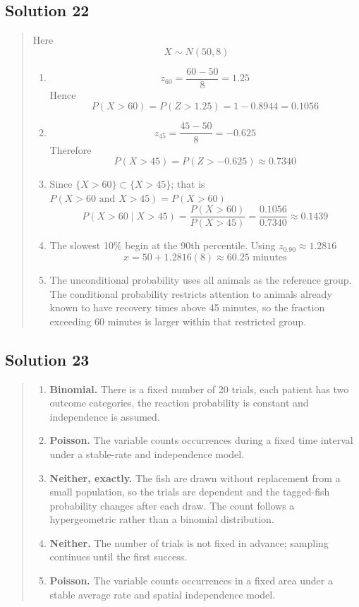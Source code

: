 \documentclass[10pt,letterpaper]{article}
\newcommand{\solutionheading}[1]{%
  \subsection*{Solution #1}
}
\newenvironment{answer}{%
  \begin{quote}\small\color{black}
}{%
  \end{quote}
}
\begin{document}
\solutionheading{22}
\begin{answer}
Here
$$X\sim N(50,8)$$
\begin{enumerate}
	\item
	$$z_{60}=\frac{60-50}{8}=1.25$$	
  	Hence
 	$$P(X>60)=P(Z>1.25)=1-0.8944=0.1056$$
  	\item
	$$z_{45}=\frac{45-50}{8}=-0.625$$
  	Therefore
 	$$P(X>45)=P(Z>-0.625)\approx0.7340$$
  	\item Since $\{X>60\}\subset\{X>45\}$; that is $P(X > 60 \text{ and } X>45) = P(X>60)$
 	$$P(X>60\mid X>45)=\frac{P(X>60)}{P(X>45)}=\frac{0.1056}{0.7340}\approx0.1439$$
  	\item The slowest 10\% begin at the 90th percentile. Using $z_{0.90}\approx1.2816$
	$$x=50+1.2816(8)\approx60.25\text{ minutes}$$
	\item The unconditional probability uses all animals as the reference group. The conditional probability restricts attention to animals already known to have recovery times above 45 minutes, so the fraction exceeding 60 minutes is larger within that restricted group.
\end{enumerate}
\end{answer}

\solutionheading{23}
\begin{answer}
\begin{enumerate}
	\item \textbf{Binomial.} There is a fixed number of 20 trials, each patient has two outcome categories, the reaction probability is constant and independence is assumed.
	\item \textbf{Poisson.} The variable counts occurrences during a fixed time interval under a stable-rate and independence model.
	\item \textbf{Neither, exactly.} The fish are drawn without replacement from a small population, so the trials are dependent and the tagged-fish probability changes after each draw. The count follows a hypergeometric rather than a binomial distribution.
	\item \textbf{Neither.} The number of trials is not fixed in advance; sampling continues until the first success.
	\item \textbf{Poisson.} The variable counts occurrences in a fixed area under a stable average rate and spatial independence model.
\end{enumerate}
\end{answer}
\end{document}
